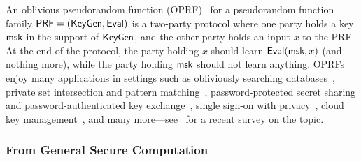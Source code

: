 An oblivious pseudorandom function (OPRF)~\cite{TCC:FIPR05} for a pseudorandom function family $\mathsf{PRF} = (\mathsf{KeyGen}, \mathsf{Eval})$ is a two-party protocol where one party holds a key $\mathsf{msk}$ in the support of $\mathsf{KeyGen}$, and the other party holds an input $x$ to the PRF. At the end of the protocol, the party holding $x$ should learn $\mathsf{Eval}(\mathsf{msk},x)$ (and nothing more), while the party holding $\mathsf{msk}$ should not learn anything. OPRFs enjoy many applications in settings such as obliviously searching databases~\cite{TCC:FIPR05}, private set intersection and pattern matching~\cite{TCC:HazLin08,CCS:KKRT16}, password-protected secret sharing and password-authenticated key exchange~\cite{AC:JarKiaKra14}, single sign-on with privacy~\cite{EUROSP:BFHLY20}, cloud key management~\cite{CCS:JarKraRes19}, and many more---see~\cite{EUROSP:CasHesLeh22} for a recent survey on the topic.

\subsubsection{From General Secure Computation}

